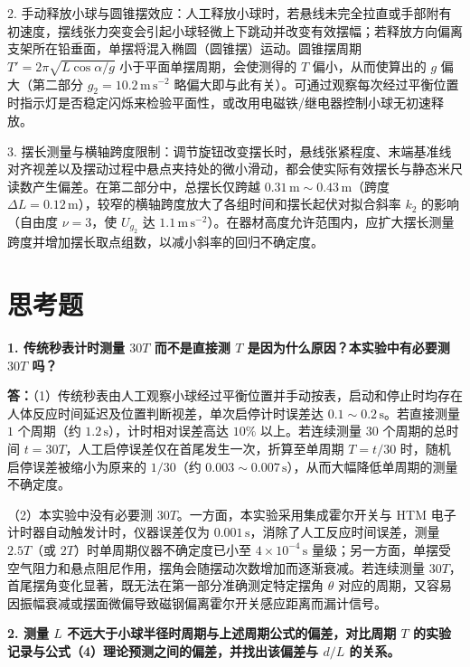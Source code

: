 \documentclass[12pt,a4paper,fontset=fandol]{ctexart}
\begin{document}
2. 手动释放小球与圆锥摆效应：人工释放小球时，若悬线未完全拉直或手部附有初速度，摆线张力突变会引起小球轻微上下跳动并改变有效摆幅；若释放方向偏离支架所在铅垂面，单摆将混入椭圆（圆锥摆）运动。圆锥摆周期 $T'=2\pi\sqrt{L\cos\alpha/g}$ 小于平面单摆周期，会使测得的 $T$ 偏小，从而使算出的 $g$ 偏大（第二部分 $g_2=10.2\,\mathrm{m\,s^{-2}}$ 略偏大即与此有关）。可通过观察每次经过平衡位置时指示灯是否稳定闪烁来检验平面性，或改用电磁铁/继电器控制小球无初速释放。

3. 摆长测量与横轴跨度限制：调节旋钮改变摆长时，悬线张紧程度、末端基准线对齐视差以及摆动过程中悬点夹持处的微小滑动，都会使实际有效摆长与静态米尺读数产生偏差。在第二部分中，总摆长仅跨越 $0.31\,\mathrm m\sim0.43\,\mathrm m$（跨度 $\Delta L=0.12\,\mathrm m$），较窄的横轴跨度放大了各组时间和摆长起伏对拟合斜率 $k_2$ 的影响（自由度 $\nu=3$，使 $U_{g_2}$ 达 $1.1\,\mathrm{m\,s^{-2}}$）。在器材高度允许范围内，应扩大摆长测量跨度并增加摆长取点组数，以减小斜率的回归不确定度。

\section{思考题}
\noindent\textbf{1. 传统秒表计时测量 $30T$ 而不是直接测 $T$ 是因为什么原因？本实验中有必要测 $30T$ 吗？}

\noindent\textbf{答：}（1）传统秒表由人工观察小球经过平衡位置并手动按表，启动和停止时均存在人体反应时间延迟及位置判断视差，单次启停计时误差达 $0.1\sim0.2\,\mathrm s$。若直接测量 $1$ 个周期（约 $1.2\,\mathrm s$），计时相对误差高达 $10\%$ 以上。若连续测量 $30$ 个周期的总时间 $t=30T$，人工启停误差仅在首尾发生一次，折算至单周期 $T=t/30$ 时，随机启停误差被缩小为原来的 $1/30$（约 $0.003\sim0.007\,\mathrm s$），从而大幅降低单周期的测量不确定度。

（2）本实验中没有必要测 $30T$。一方面，本实验采用集成霍尔开关与 HTM 电子计时器自动触发计时，仪器误差仅为 $0.001\,\mathrm s$，消除了人工反应时间误差，测量 $2.5T$（或 $2T$）时单周期仪器不确定度已小至 $4\times10^{-4}\,\mathrm s$ 量级；另一方面，单摆受空气阻力和悬点阻尼作用，摆角会随摆动次数增加而逐渐衰减。若连续测量 $30T$，首尾摆角变化显著，既无法在第一部分准确测定特定摆角 $\theta$ 对应的周期，又容易因振幅衰减或摆面微偏导致磁钢偏离霍尔开关感应距离而漏计信号。

\medskip
\noindent\textbf{2. 测量 $L$ 不远大于小球半径时周期与上述周期公式的偏差，对比周期 $T$ 的实验记录与公式（4）理论预测之间的偏差，并找出该偏差与 $d/L$ 的关系。}
\end{document}
